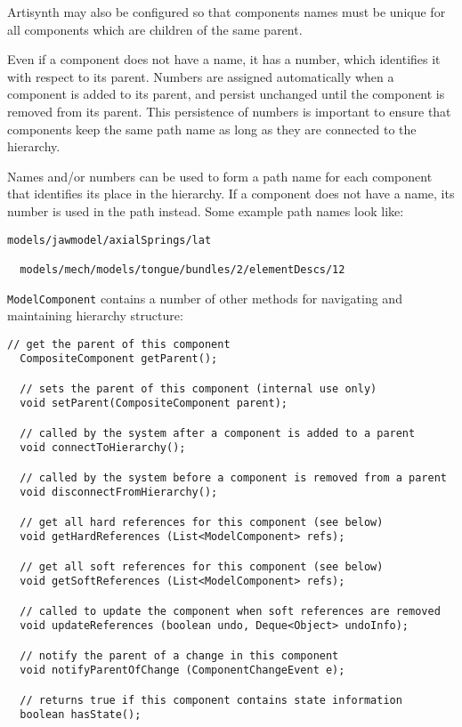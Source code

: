 \documentclass{article}
\begin{document}
Artisynth may also be configured so that components names must be
unique for all components which are children of the same parent.

Even if a component does not have a name, it has a number, which
identifies it with respect to its parent. Numbers are assigned
automatically when a component is added to its parent, and persist
unchanged until the component is removed from its parent.  This
persistence of numbers is important to ensure that components keep the
same path name as long as they are connected to the hierarchy.

Names and/or numbers can be used to form a path name for each
component that identifies its place in the hierarchy.  If a component
does not have a name, its number is used in the path instead. Some
example path names look like:

\begin{lstlisting}[]
  models/jawmodel/axialSprings/lat

  models/mech/models/tongue/bundles/2/elementDescs/12
\end{lstlisting}

{\tt ModelComponent} contains a number of other methods for navigating
and maintaining hierarchy structure:

\begin{lstlisting}[]
  // get the parent of this component
  CompositeComponent getParent();

  // sets the parent of this component (internal use only)
  void setParent(CompositeComponent parent);

  // called by the system after a component is added to a parent
  void connectToHierarchy();

  // called by the system before a component is removed from a parent
  void disconnectFromHierarchy();

  // get all hard references for this component (see below)
  void getHardReferences (List<ModelComponent> refs);

  // get all soft references for this component (see below)
  void getSoftReferences (List<ModelComponent> refs);

  // called to update the component when soft references are removed 
  void updateReferences (boolean undo, Deque<Object> undoInfo);

  // notify the parent of a change in this component
  void notifyParentOfChange (ComponentChangeEvent e);

  // returns true if this component contains state information
  boolean hasState();
\end{lstlisting}
\end{document}
